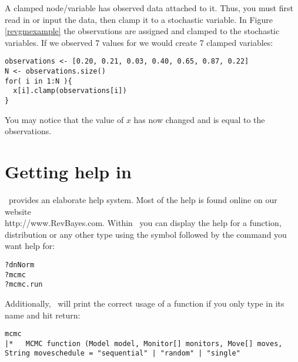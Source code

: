 A clamped node/variable has observed data attached to it. 
Thus, you must first read in or input the data, then clamp it to a stochastic variable. 
In Figure \ref{revgmexample} the observations are assigned and clamped to the stochastic variables.
If we observed 7 values for  we would create 7 clamped variables:
{\tt \begin{snugshade*}
\begin{lstlisting}
observations <- [0.20, 0.21, 0.03, 0.40, 0.65, 0.87, 0.22]
N <- observations.size()
for( i in 1:N ){
  x[i].clamp(observations[i])
}
\end{lstlisting}
\end{snugshade*}}
You may notice that the value of $x$ has now changed and is equal to the observations.



\section{Getting help in \RevBayes}

\RevBayes~provides an elaborate help system. 
Most of the help is found online on our website \\
http://www.RevBayes.com.
Within \RevBayes~you can display the help for a function, distribution or any other type using the  symbol followed by the command you want help for:
{\tt \begin{snugshade*}
\begin{lstlisting}
?dnNorm
?mcmc
?mcmc.run
\end{lstlisting}
\end{snugshade*}}

Additionally, \RevBayes~will print the correct usage of a function if you only type in its name and hit return:
{\tt \small \begin{snugshade*}
\begin{lstlisting}
mcmc
|*   MCMC function (Model model, Monitor[] monitors, Move[] moves, String moveschedule = "sequential" | "random" | "single"
\end{lstlisting}
\end{snugshade*}}





